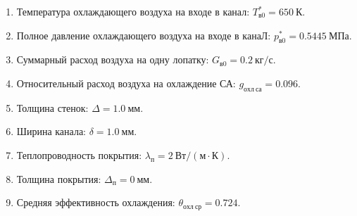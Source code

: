 \documentclass[a4paper,10pt]{article}
\begin{document}
    
    \begin{enumerate}

        \item Температура охлаждающего воздуха на входе в канал:
            $ T_{в0}^{*} = 650\ К$.
        \item Полное давление охлаждающего воздуха на входе в канаЛ:
            $ p_{в0}^* = 0.5445\ МПа $.
        \item Суммарный расход воздуха на одну лопатку: $G_{в0} = 0.2\ кг/с$.
        \item Относительный расход воздуха на охлаждение СА:
            $g_{охл\ са} = 0.096$.
        \item Толщина стенок: $\Delta = 1.0\ мм$.
        \item Ширина канала: $\delta = 1.0\ мм$.
        \item Теплопроводность покрытия: $\lambda_п = 2\ Вт/(м \cdot К)$.
        \item Толщина покрытия: $\Delta_п = 0\ мм$.
        \item Средняя эффективность охлаждения: $\theta_{охл\ ср} = 0.724$.
    \end{enumerate}
    
\end{document}

